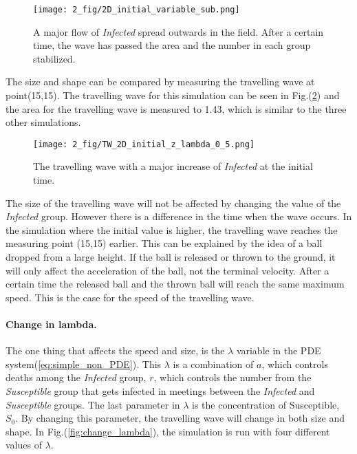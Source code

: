 \documentclass[%
twoside,                 %
final,                   %
chapterprefix=true,      %
open=right               %
10pt]{book}
\begin{document}
\begin{figure}[ht]
  \centerline{\texttt{[image: 2\_fig/2D\_initial\_variable\_sub.png]}}
  \caption{
  \label{fig:initial_value} A major flow of \emph{Infected} spread outwards in the field. After a certain time, the wave has passed the area and the number in each group stabilized.
  }
\end{figure}




\vspace{3mm}




\vspace{3mm}


The size and shape can be compared by measuring the travelling wave at point(15,15). The travelling wave for this simulation can be seen in Fig.(\ref{fig:initial_trav_wave}) and the area for the travelling wave is measured to 1.43, which is similar to the three other simulations.


\begin{figure}[ht]
  \centerline{\texttt{[image: 2\_fig/TW\_2D\_initial\_z\_lambda\_0\_5.png]}}
  \caption{
  \label{fig:initial_trav_wave} The travelling wave with a major increase of \emph{Infected} at the initial time.
  }
\end{figure}




\vspace{3mm}




\vspace{3mm}


The size of the travelling  wave will not be affected by changing the value of the \emph{Infected} group. However there is a difference in the time when the wave occurs. In the simulation where the initial value is higher, the travelling wave reaches the measuring point (15,15) earlier. This can be explained by the idea of a ball dropped from a large height. If the ball is released or thrown to the ground, it will only affect the acceleration of the ball, not the terminal velocity. After a certain time the released ball and the thrown ball will reach the same maximum speed. This is the case for the speed of the travelling wave. 
\paragraph{Change in lambda.}
The one thing that affects the speed and size, is the $\lambda$ variable in the PDE system(\ref{eq:simple_non_PDE}). This $\lambda$ is a combination of $a$, which controls deaths among the \emph{Infected} group, $r$, which controls the number from the \emph{Susceptible} group that gets infected in meetings between the \emph{Infected} and \emph{Susceptible} groups. The last parameter in $\lambda$ is the concentration of Susceptible, $S_0$. By changing this parameter, the travelling wave will change in both size and shape. In Fig.(\ref{fig:change_lambda}), the simulation is run with four different values of $\lambda$.
\end{document}
